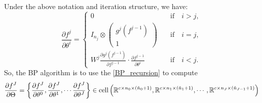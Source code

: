 Under the above notation and iteration structure, we have:
\begin{equation}\label{BP_recursion}
\frac{\partial f^j}{\partial \theta^i} = \begin{cases}
0 \quad &\text{if} \quad i > j, \\
I_{n_j} \otimes \begin{pmatrix}
g^{j}(f^{j-1}) \\
1 
\end{pmatrix} \quad &\text{if} \quad i = j,\\
W^j  \frac{\partial g^{j}(f^{j-1})}{\partial f^{j-1}} \cdot \frac{\partial f^{j-1}}{\partial \theta^i}  \quad &\text{if} \quad i < j.
\end{cases}
\end{equation}
So, the BP algorithm is to use the \eqref{BP_recursion} to compute
\begin{equation}
\frac{\partial f^J}{\partial {\Theta} } 
= \left\{
\frac{\partial  f^J}{\partial {\theta^0} }, 
\frac{\partial  f^J}{\partial {\theta^1} }, 
\cdots \frac{\partial f^J}{\partial
	{\theta^J} }\right\} \in {\rm cell}
\left(
\mathbb R^{c\times n_0 \times (\hat n_0 + 1)},  
\mathbb R^{c\times n_1 \times (\hat n_1 + 1)},  
\cdots, \mathbb
R^{c\times n_{J} \times (\hat n_{J-1}+1)}
\right)
\end{equation}

